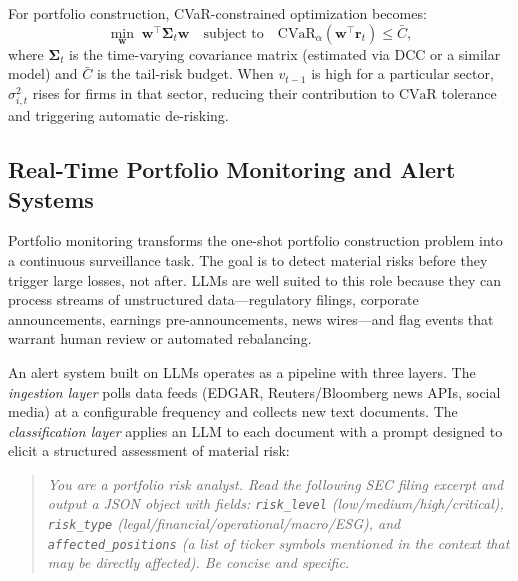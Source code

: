 For portfolio construction, CVaR-constrained optimization becomes:
\begin{equation}
  \min_{\mathbf{w}} \; \mathbf{w}^\top \boldsymbol{\Sigma}_t \mathbf{w}
  \quad \text{subject to} \quad \text{CVaR}_\alpha(\mathbf{w}^\top \mathbf{r}_t)
  \leq \bar{C},
  \label{eq:ch10-cvar-constrained}
\end{equation}
where $\boldsymbol{\Sigma}_t$ is the time-varying covariance matrix (estimated via DCC
\citep{engle2002dynamic} or a similar model) and $\bar{C}$ is the tail-risk budget.
When $v_{t-1}$ is high for a particular sector, $\sigma_{i,t}^2$ rises for firms in
that sector, reducing their contribution to $\text{CVaR}$ tolerance and triggering
automatic de-risking.

\subsection{Real-Time Portfolio Monitoring and Alert Systems}
\label{sec:ch10-portfolio-monitoring}

Portfolio monitoring transforms the one-shot portfolio construction problem into a
continuous surveillance task. The goal is to detect material risks before they trigger
large losses, not after. LLMs are well suited to this role because they can process
streams of unstructured data---regulatory filings, corporate announcements, earnings
pre-announcements, news wires---and flag events that warrant human review or automated
rebalancing.

An alert system built on LLMs operates as a pipeline with three layers. The
\emph{ingestion layer} polls data feeds (EDGAR, Reuters/Bloomberg news APIs, social
media) at a configurable frequency and collects new text documents. The
\emph{classification layer} applies an LLM to each document with a prompt designed to
elicit a structured assessment of material risk:

\begin{quote}
\textit{You are a portfolio risk analyst. Read the following SEC filing excerpt and output
a JSON object with fields: \texttt{risk\_level} (low/medium/high/critical), \texttt{risk\_type}
(legal/financial/operational/macro/ESG), and \texttt{affected\_positions} (a list of
ticker symbols mentioned in the context that may be directly affected). Be concise and
specific.}
\end{quote}

